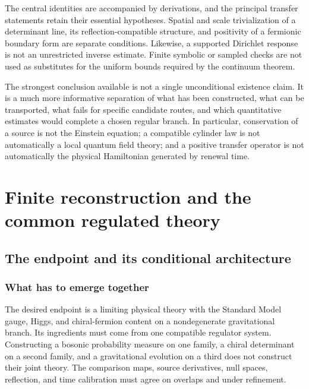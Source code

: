 \documentclass[11pt,a4paper,oneside]{book}
\theoremstyle{plain}
\theoremstyle{definition}
\theoremstyle{remark}
\begin{document}
The central identities are accompanied by derivations, and the principal
transfer statements retain their essential hypotheses.  Spatial and scale
trivialization of a determinant line, its reflection-compatible structure,
and positivity of a fermionic boundary form are separate conditions.
Likewise, a supported Dirichlet response is not an unrestricted inverse
estimate.  Finite symbolic or sampled checks are not used as substitutes
for the uniform bounds required by the continuum theorem.

The strongest conclusion available is not a single unconditional existence claim. It is a much more informative separation of what has been constructed, what can be transported, what fails for specific candidate routes, and which quantitative estimates would complete a chosen regular branch. In particular, conservation of a source is not the Einstein equation; a compatible cylinder law is not automatically a local quantum field theory; and a positive transfer operator is not automatically the physical Hamiltonian generated by renewal time.

\begingroup
\setlength{\parskip}{0pt}
\linespread{0.97}\selectfont
\tableofcontents
\endgroup
\mainmatter
\part{Finite reconstruction and the common regulated theory}


\chapter{The endpoint and its conditional architecture}
\label{ch:architecture}
\section{What has to emerge together}
The desired endpoint is a limiting physical theory with the Standard Model gauge, Higgs, and chiral-fermion content on a nondegenerate gravitational branch. Its ingredients must come from one compatible regulator system. Constructing a bosonic probability measure on one family, a chiral determinant on a second family, and a gravitational evolution on a third does not construct their joint theory. The comparison maps, source derivatives, null spaces, reflection, and time calibration must agree on overlaps and under refinement.
\end{document}
